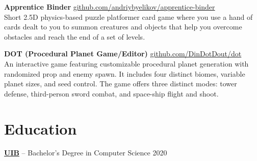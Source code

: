 \documentclass[10pt]{article}       %
\begin{document}

\vspace{5pt}
\textbf{Apprentice Binder} \hfill \href{https://github.com/andriybyelikov/apprentice-binder}{github.com/andriybyelikov/apprentice-binder} \\
Short 2.5D physics-based puzzle platformer card game where you use a hand of cards dealt to you to
summon creatures and objects that help you overcome obstacles and reach the end of a set of levels.

\vspace{5pt}
\textbf{DOT (Procedural Planet Game/Editor)} \hfill \href{https://github.com/DinDotDout/dot}{github.com/DinDotDout/dot} \\
An interactive game featuring customizable procedural planet generation with randomized prop
and enemy spawn. It includes four distinct biomes, variable planet sizes, and seed control.
The game offers three distinct modes: tower defense, third-person sword combat, and space-ship flight and shoot.
\vspace{5pt}
\vspace{-18.5pt}
\section*{Education}
\textbf{\href{https://www.uib.eu/}{UIB}} -- Bachelor's Degree in Computer Science \hfill 2020 \\
\end{document}
